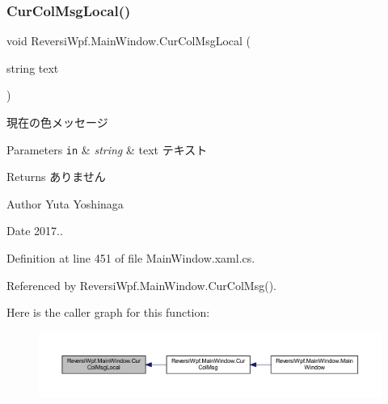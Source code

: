 \subsubsection{\texorpdfstring{Cur\+Col\+Msg\+Local()}{CurColMsgLocal()}}
{\footnotesize\ttfamily void Reversi\+Wpf.\+Main\+Window.\+Cur\+Col\+Msg\+Local (\begin{DoxyParamCaption}\item[{string}]{text }\end{DoxyParamCaption})}



現在の色メッセージ 


\begin{DoxyParams}[1]{Parameters}
\mbox{\tt in}  & {\em string} & text テキスト \\
\hline
\end{DoxyParams}
\begin{DoxyReturn}{Returns}
ありません 
\end{DoxyReturn}
\begin{DoxyAuthor}{Author}
Yuta Yoshinaga 
\end{DoxyAuthor}
\begin{DoxyDate}{Date}
2017.. 
\end{DoxyDate}


Definition at line 451 of file Main\+Window.\+xaml.\+cs.



Referenced by Reversi\+Wpf.\+Main\+Window.\+Cur\+Col\+Msg().

Here is the caller graph for this function\+:
\nopagebreak
\begin{figure}[H]
\begin{center}
\leavevmode
\includegraphics[width=350pt]{class_reversi_wpf_1_1_main_window_a92d45fe8b0224e36ce974e04388ec541_icgraph}
\end{center}
\end{figure}
\mbox{\label{class_reversi_wpf_1_1_main_window_a90e6aa75849526159fe9348da2b66fb0}} 
